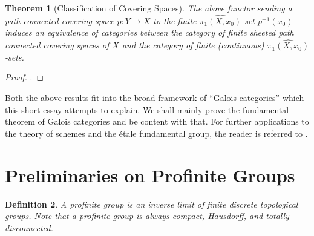 \documentclass[10pt]{article}
\theoremstyle{thmstyle}
\newtheorem{theorem}{Theorem}[section]
\theoremstyle{defstyle}
\newtheorem{definition}[theorem]{Definition}
\newcommand{\wh}[1]{\widehat{#1}}
\begin{document}
\begin{theorem}[Classification of Covering Spaces]
    The above functor sending a path connected covering space $p: Y\to X$ to the finite $\wh{\pi_1(X, x_0)}$-set $p^{-1}(x_0)$ induces an equivalence of categories between the category of finite sheeted path connected covering spaces of $X$ and the category of finite (continuous) $\wh{\pi_1(X, x_0)}$-sets.
\end{theorem}
\begin{proof}
    \cite[Corollary 2.3.9]{szamuely-galois}.
\end{proof}

Both the above results fit into the broad framework of ``Galois categories'' which this short essay attempts to explain. We shall mainly prove the fundamental theorem of Galois categories and be content with that. For further applications to the theory of schemes and the \'etale fundamental group, the reader is referred to \cite{lenstra-gschemes}.

\section{Preliminaries on Profinite Groups}

\begin{definition}
    A profinite group is an inverse limit of finite discrete topological groups. Note that a profinite group is always compact, Hausdorff, and totally disconnected.
\end{definition}
\end{document}
